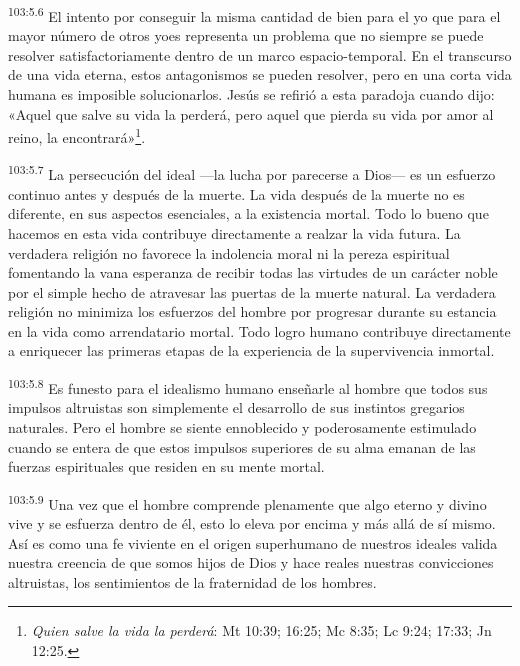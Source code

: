 \par
\textsuperscript{103:5.6} El intento por conseguir la misma cantidad de bien para el yo que para el mayor número de otros yoes representa un problema que no siempre se puede resolver satisfactoriamente dentro de un marco espacio-temporal. En el transcurso de una vida eterna, estos antagonismos se pueden resolver, pero en una corta vida humana es imposible solucionarlos. Jesús se refirió a esta paradoja cuando dijo: «Aquel que salve su vida la perderá, pero aquel que pierda su vida por amor al reino, la encontrará»\footnote{\textit{Quien salve la vida la perderá}: Mt 10:39; 16:25; Mc 8:35; Lc 9:24; 17:33; Jn 12:25.}.

\par
\textsuperscript{103:5.7} La persecución del ideal ---la lucha por parecerse a Dios--- es un esfuerzo continuo antes y después de la muerte. La vida después de la muerte no es diferente, en sus aspectos esenciales, a la existencia mortal. Todo lo bueno que hacemos en esta vida contribuye directamente a realzar la vida futura. La verdadera religión no favorece la indolencia moral ni la pereza espiritual fomentando la vana esperanza de recibir todas las virtudes de un carácter noble por el simple hecho de atravesar las puertas de la muerte natural. La verdadera religión no minimiza los esfuerzos del hombre por progresar durante su estancia en la vida como arrendatario mortal. Todo logro humano contribuye directamente a enriquecer las primeras etapas de la experiencia de la supervivencia inmortal.

\par
\textsuperscript{103:5.8} Es funesto para el idealismo humano enseñarle al hombre que todos sus impulsos altruistas son simplemente el desarrollo de sus instintos gregarios naturales. Pero el hombre se siente ennoblecido y poderosamente estimulado cuando se entera de que estos impulsos superiores de su alma emanan de las fuerzas espirituales que residen en su mente mortal.

\par
\textsuperscript{103:5.9} Una vez que el hombre comprende plenamente que algo eterno y divino vive y se esfuerza dentro de él, esto lo eleva por encima y más allá de sí mismo. Así es como una fe viviente en el origen superhumano de nuestros ideales valida nuestra creencia de que somos hijos de Dios y hace reales nuestras convicciones altruistas, los sentimientos de la fraternidad de los hombres.

